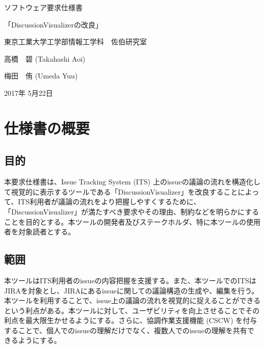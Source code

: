 \documentclass[12pt, oneside]{jreport}
\begin{document}
\begin{center}

{\Huge ソフトウェア要求仕様書}

\vspace{15mm}

{\huge 「DiscussionVisualizerの改良」}

\vspace{30mm}

{\Large 東京工業大学工学部情報工学科　佐伯研究室}

\vspace{10mm}

{\large 高橋　碧 (Takahashi Aoi)}

\vspace{1mm}

{\large 梅田　侑 (Umeda Yuu)}

\vspace{10mm}

{\large 2017年 5月22日}

\end{center}

\newpage 


\tableofcontents
\clearpage



\chapter{仕様書の概要}

	\section{目的}
	本要求仕様書は、Issue Tracking System (ITS) 上のissueの議論の流れを構造化して視覚的に表示するツールである「DiscussionVisualizer」を改良することによって、ITS利用者が議論の流れをより把握しやすくするために、「DiscussionVisualizer」が満たすべき要求やその理由、制約などを明らかにすることを目的とする。本ツールの開発者及びステークホルダ、特に本ツールの使用者を対象読者とする。
	
	\section{範囲}
	本ツールはITS利用者のissueの内容把握を支援する。また、本ツールでのITSはJIRAを対象とし、JIRAにあるissueに関しての議論構造の生成や、編集を行う。本ツールを利用することで、issue上の議論の流れを視覚的に捉えることができるという利点がある。本ツールに対して、ユーザビリティを向上させることでその利点を最大限生かせるようにする。さらに、協調作業支援機能 (CSCW) を付与することで、個人でのissueの理解だけでなく、複数人でのissueの理解を共有できるようにする。
	
\end{document}
